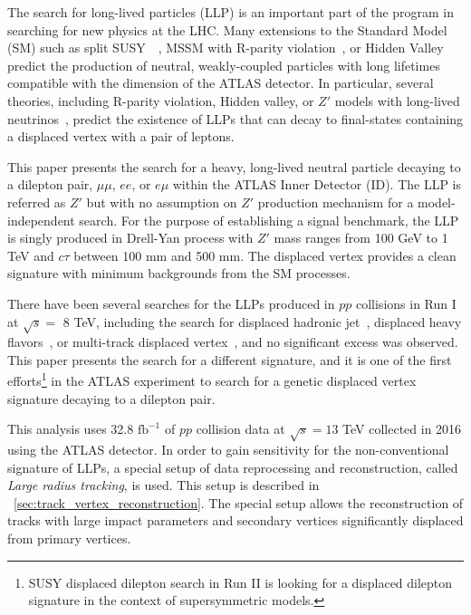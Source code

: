 The search for long-lived particles (LLP) is an important part of the program in searching for new physics at the LHC. Many extensions to the Standard Model (SM) such as split SUSY~\cite{Hewett:2004nw}~\cite{ArkaniHamed:2004yi}, MSSM with R-parity violation~\cite{Barbier:2004ez}, or Hidden Valley~\cite{Han:2007ae} predict the production of neutral, weakly-coupled particles with long lifetimes compatible with the dimension of the ATLAS detector. In particular, several theories, including R-parity violation, Hidden valley, or $Z'$ models with long-lived neutrinos~\cite{Basso:2008iv}, predict the existence of LLPs that can decay to final-states containing a displaced vertex with a pair of leptons.

This paper presents the search for a heavy, long-lived neutral particle decaying to a dilepton pair, $\mu\mu$, $ee$, or $e\mu$ within the ATLAS Inner Detector (ID). The LLP is referred as $Z'$ but with no assumption on $Z'$ production mechanism for a model-independent search. For the purpose of establishing a signal benchmark, the LLP is singly produced in Drell-Yan process with $Z'$ mass ranges from 100 GeV to 1 TeV and $c\tau$ between 100 mm and 500 mm. The displaced vertex provides a clean signature with minimum backgrounds from the SM processes.

There have been several searches for the LLPs produced in $pp$ collisions in Run I at $\sqrt{s} =$ 8 TeV, including the search for displaced hadronic jet~\cite{Blackburn:1550730}, displaced heavy flavors~\cite{Harris:1512932}, or multi-track displaced vertex~\cite{Aad:2015rba}, and no significant excess was observed. This paper presents the search for a different signature, and it is one of the first efforts\footnote{SUSY displaced dilepton search in Run II is looking for a displaced dilepton signature in the context of supersymmetric models.} in the ATLAS experiment to search for a genetic displaced vertex signature decaying to a dilepton pair.

This analysis uses 32.8 $\mathrm{fb^{-1}}$ of $pp$ collision data at $\sqrt{s}=13$ TeV collected in 2016 using the ATLAS detector. In order to gain sensitivity for the non-conventional signature of LLPs, a special setup of data reprocessing and reconstruction, called \textit{Large radius tracking}, is used. This setup is described in ~\ref{sec:track_vertex_reconstruction}. The special setup allows the reconstruction of tracks with large impact parameters and secondary vertices significantly displaced from primary vertices.


